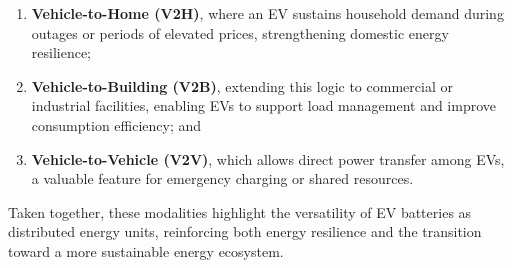 \begin{enumerate}
    \item 
\textbf{Vehicle-to-Home (V2H)}, where an EV sustains household demand during outages or periods of elevated prices, strengthening domestic energy resilience;
\item
\textbf{Vehicle-to-Building (V2B)}, extending this logic to commercial or industrial facilities, enabling EVs to support load management and improve consumption efficiency; and 
\item
\textbf{Vehicle-to-Vehicle (V2V)}, which allows direct power transfer among EVs, a valuable feature for emergency charging or shared resources. 
\end{enumerate}
Taken together, these modalities highlight the versatility of EV batteries as distributed energy units, reinforcing both energy resilience and the transition toward a more sustainable energy ecosystem.

